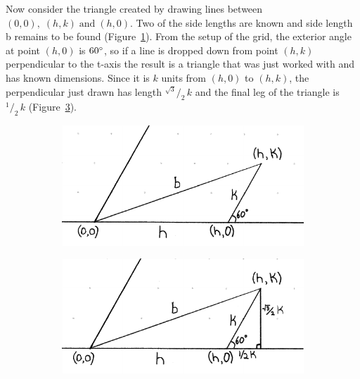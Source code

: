 \documentclass[12pt,letter]{article}
\newcommand*\rfrac[2]{{}^{#1}\!/_{#2}}
\begin{document}
Now consider the triangle created by drawing lines between $(0,0), \; (h,k) \; \text{and} \; (h,0)$. Two of the side lengths are known and side length b remains to be found (Figure~\ref{fig:base_setup}). From the setup of the grid, the exterior angle at point $(h,0)$ is $60\degree$, so if a line is dropped down from point $(h,k)$ perpendicular to the t-axis the result is a triangle that was just worked with and has known dimensions. Since it is $k$ units from $(h,0)$ to $(h,k)$, the perpendicular just drawn has length $\rfrac{\sqrt{3}} {2} \, k$ and the final leg of the triangle is $\rfrac 1 2 \, k$ (Figure~\ref{fig:base_right}).

\begin{figure}[h]
	\centering
	\caption{Calculating the Base}
	\begin{subfigure}[h]{0.45\textwidth}
		\includegraphics[width=\textwidth]{ddagger1.pdf}
		\caption{}
		\label{fig:base_setup}
	\end{subfigure}
	\begin{subfigure}[h]{0.45\textwidth}
		\includegraphics[width=\textwidth]{ddagger2.pdf}
		\caption{}
		\label{fig:base_right}
	\end{subfigure}
	\vspace{-20pt}
\end{figure}
\end{document}
